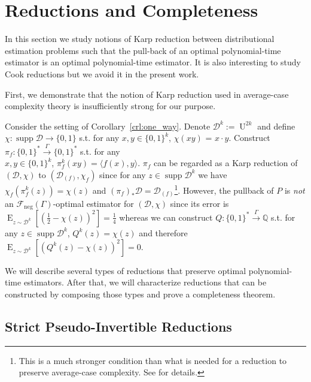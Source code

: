 \documentclass[11pt]{article}
\numberwithin{equation}{section}
\theoremstyle{definition}
\theoremstyle{plain}
\newcommand{\Bool}{\{0,1\}}
\newcommand{\Words}{{\Bool^*}}
\DeclareMathOperator{\Supp}{supp}
\DeclareMathOperator{\E}{E}
\DeclareMathOperator{\Un}{U}
\newcommand{\Rats}{\mathbb{Q}}
\newcommand{\Chev}[1]{\langle #1 \rangle}
\newcommand{\Dist}{\mathcal{D}}
\newcommand{\Fall}{\mathcal{F}}
\newcommand{\Scheme}{\xrightarrow{\Gamma}}
\begin{document}
\section{Reductions and Completeness}
\label{sec:reductions}

In this section we study notions of Karp reduction between distributional estimation problems such that the pull-back of an optimal polynomial-time estimator is an optimal polynomial-time estimator. It is also interesting to study Cook reductions but we avoid it in the present work.

First, we demonstrate that the notion of Karp reduction used in average-case complexity theory is insufficiently strong for our purpose.%

Consider the setting of Corollary~\ref{crl:one_way}. Denote $\Dist^k:=\Un^{2k}$ and define ${\chi: \Supp \Dist \rightarrow \Bool}$ s.t. for any $x,y \in \Bool^k$, $\chi(xy)$ = $x \cdot y$. Construct $\pi_f: \Words \Scheme \Words$ s.t. for any\\ $x,y \in \Bool^k$, ${\pi_f^k(xy) = \Chev{f(x),y}}$. $\pi_f$ can be regarded as a Karp reduction of $(\Dist, \chi)$ to $(\Dist_{(f)},\chi_f)$ since for any ${z \in \Supp \Dist^k}$ we have $\chi_f(\pi_f^k(z))=\chi(z)$ and $(\pi_f)_*\Dist=\Dist_{(f)}$\footnote{This is a much stronger condition than what is needed for a reduction to preserve average-case complexity. See \cite{Bogdanov_2006} for details.}. However, the pullback of $P$ is \emph{not} an $\Fall_{\text{neg}}(\Gamma)$-optimal estimator for $(\Dist,\chi)$ since its error is $\E_{z \sim \Dist^k}[(\frac{1}{2}-\chi(z))^2]=\frac{1}{4}$ whereas we can construct $Q: \Words \Scheme \Rats$ s.t. for any $z \in \Supp \Dist^k$, $Q^k(z)=\chi(z)$ and therefore $\E_{z \sim \Dist^k}[(Q^k(z)-\chi(z))^2]=0$.

We will describe several types of reductions that preserve optimal polynomial-time estimators. After that, we will characterize reductions that can be constructed by composing those types and prove a completeness theorem.

\subsection{Strict Pseudo-Invertible Reductions}
\end{document}
